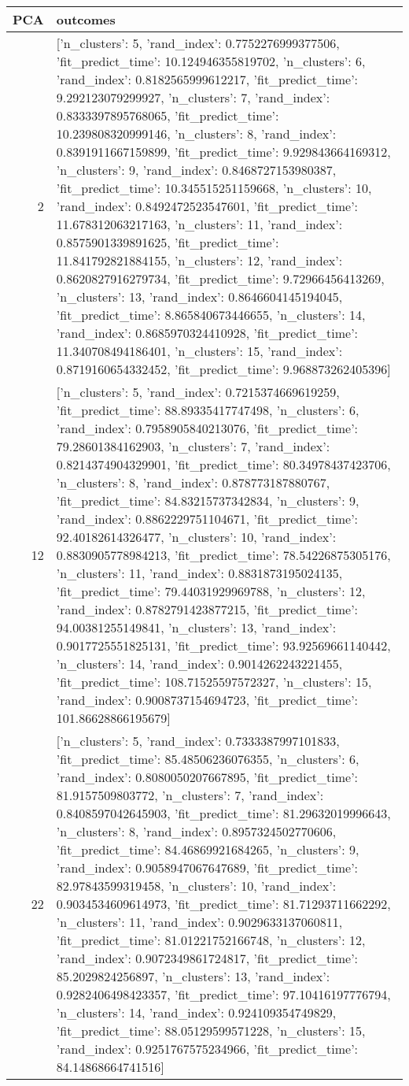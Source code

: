 \begin{tabular}{rl}
\toprule
PCA & outcomes \\
\midrule
2 & [{'n_clusters': 5, 'rand_index': 0.7752276999377506, 'fit_predict_time': 10.124946355819702}, {'n_clusters': 6, 'rand_index': 0.8182565999612217, 'fit_predict_time': 9.292123079299927}, {'n_clusters': 7, 'rand_index': 0.8333397895768065, 'fit_predict_time': 10.239808320999146}, {'n_clusters': 8, 'rand_index': 0.8391911667159899, 'fit_predict_time': 9.929843664169312}, {'n_clusters': 9, 'rand_index': 0.8468727153980387, 'fit_predict_time': 10.345515251159668}, {'n_clusters': 10, 'rand_index': 0.8492472523547601, 'fit_predict_time': 11.678312063217163}, {'n_clusters': 11, 'rand_index': 0.8575901339891625, 'fit_predict_time': 11.841792821884155}, {'n_clusters': 12, 'rand_index': 0.8620827916279734, 'fit_predict_time': 9.72966456413269}, {'n_clusters': 13, 'rand_index': 0.8646604145194045, 'fit_predict_time': 8.865840673446655}, {'n_clusters': 14, 'rand_index': 0.8685970324410928, 'fit_predict_time': 11.340708494186401}, {'n_clusters': 15, 'rand_index': 0.8719160654332452, 'fit_predict_time': 9.968873262405396}] \\
12 & [{'n_clusters': 5, 'rand_index': 0.7215374669619259, 'fit_predict_time': 88.89335417747498}, {'n_clusters': 6, 'rand_index': 0.7958905840213076, 'fit_predict_time': 79.28601384162903}, {'n_clusters': 7, 'rand_index': 0.8214374904329901, 'fit_predict_time': 80.34978437423706}, {'n_clusters': 8, 'rand_index': 0.878773187880767, 'fit_predict_time': 84.83215737342834}, {'n_clusters': 9, 'rand_index': 0.8862229751104671, 'fit_predict_time': 92.40182614326477}, {'n_clusters': 10, 'rand_index': 0.8830905778984213, 'fit_predict_time': 78.54226875305176}, {'n_clusters': 11, 'rand_index': 0.8831873195024135, 'fit_predict_time': 79.44031929969788}, {'n_clusters': 12, 'rand_index': 0.8782791423877215, 'fit_predict_time': 94.00381255149841}, {'n_clusters': 13, 'rand_index': 0.9017725551825131, 'fit_predict_time': 93.92569661140442}, {'n_clusters': 14, 'rand_index': 0.9014262243221455, 'fit_predict_time': 108.71525597572327}, {'n_clusters': 15, 'rand_index': 0.9008737154694723, 'fit_predict_time': 101.86628866195679}] \\
22 & [{'n_clusters': 5, 'rand_index': 0.7333387997101833, 'fit_predict_time': 85.48506236076355}, {'n_clusters': 6, 'rand_index': 0.8080050207667895, 'fit_predict_time': 81.9157509803772}, {'n_clusters': 7, 'rand_index': 0.8408597042645903, 'fit_predict_time': 81.29632019996643}, {'n_clusters': 8, 'rand_index': 0.8957324502770606, 'fit_predict_time': 84.46869921684265}, {'n_clusters': 9, 'rand_index': 0.9058947067647689, 'fit_predict_time': 82.97843599319458}, {'n_clusters': 10, 'rand_index': 0.9034534609614973, 'fit_predict_time': 81.71293711662292}, {'n_clusters': 11, 'rand_index': 0.9029633137060811, 'fit_predict_time': 81.01221752166748}, {'n_clusters': 12, 'rand_index': 0.9072349861724817, 'fit_predict_time': 85.2029824256897}, {'n_clusters': 13, 'rand_index': 0.9282406498423357, 'fit_predict_time': 97.10416197776794}, {'n_clusters': 14, 'rand_index': 0.924109354749829, 'fit_predict_time': 88.05129599571228}, {'n_clusters': 15, 'rand_index': 0.9251767575234966, 'fit_predict_time': 84.14868664741516}] \\

\end{tabular}
